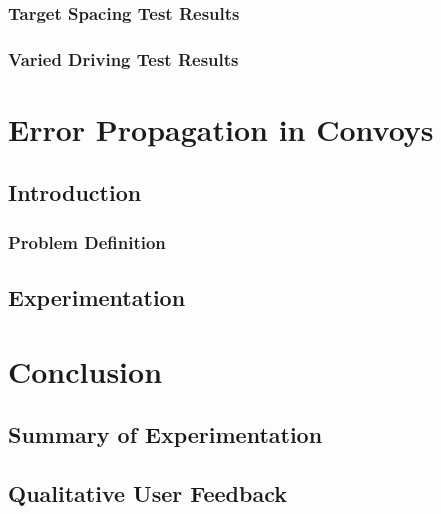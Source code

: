 \documentclass[12pt]{report}
\begin{document}
\subsection{Target Spacing Test Results} \label{sec:targetspacingtestresults}


\subsection{Varied Driving Test Results} \label{sec:variedtestresults}




\chapter{Error Propagation in Convoys} \label{chap:errprop}

\section{Introduction} \label{sec:errintro}

\subsection{Problem Definition}

\section{Experimentation}




\chapter{Conclusion} \label{chap:concl}


\section{Summary of Experimentation} \label{sec:summexper}

\section{Qualitative User Feedback} \label{sec:qual}
\end{document}
